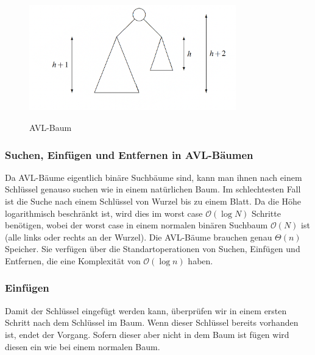 \documentclass[a4paper]{article}
\begin{document}
\begin{figure}[t] 
\caption{AVL-Baum}
\centering
\includegraphics[width = 0.8\textwidth]{Pictures/AVL-trees-allg.png}
\label{fig: AVL-trees-allg}
\end{figure}

\newpage
\subsubsection{Suchen, Einfügen und Entfernen in AVL-Bäumen}
Da AVL-Bäume eigentlich binäre Suchbäume sind, kann man ihnen nach einem Schlüssel genauso suchen wie in einem natürlichen Baum. Im schlechtesten Fall ist die Suche nach einem Schlüssel von Wurzel bis zu einem Blatt. Da die Höhe logarithmisch beschränkt ist, wird dies im worst case $\mathcal{O} (\log N)$ Schritte benötigen, wobei der worst case in einem normalen binären Suchbaum $\mathcal{O} (N)$ ist (alle links oder rechts an der Wurzel). Die AVL-Bäume brauchen genau $\Theta (n)$ Speicher. Sie verfügen über die Standartoperationen von Suchen, Einfügen und Entfernen, die eine Komplexität von $\mathcal{O}(\log n)$ haben. 

\subsubsection{Einfügen}\label{subsection EinfügenAVL}
Damit der Schlüssel eingefügt werden kann, überprüfen wir in einem ersten Schritt nach dem Schlüssel im Baum. Wenn dieser Schlüssel bereits vorhanden ist, endet der Vorgang. Sofern dieser aber nicht in dem Baum ist fügen wird diesen ein wie bei einem normalen Baum.
\end{document}
